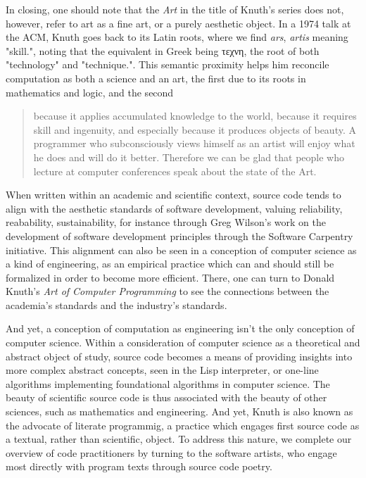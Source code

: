 In closing, one should note that the \emph{Art} in the title of Knuth's series does not, however, refer to art as a fine art, or a purely aesthetic object. In a 1974 talk at the ACM, Knuth goes back to its Latin roots, where we find \emph{ars}, \emph{artis} meaning "skill.", noting that the equivalent in Greek being τεχνη, the root of both "technology" and "technique.". This semantic proximity helps him reconcile computation as both a science and an art, the first due to its roots in mathematics and logic, and the second

\begin{quote}
  because it applies accumulated knowledge to the world, because it requires skill and ingenuity, and especially because it produces objects of beauty. A programmer who subconsciously views himself as an artist will enjoy what he does and will do it better. Therefore we can be glad that people who lecture at computer conferences speak about the state of the Art. \citep{knuth_computer_1974}
\end{quote}

When written within an academic and scientific context, source code tends to align with the aesthetic standards of software development, valuing reliability, reabability, sustainability, for instance through Greg Wilson's work on the development of software development principles through the Software Carpentry initiative. This alignment can also be seen in a conception of computer science as a kind of engineering, as an empirical practice which can and should still be formalized in order to become more efficient. There, one can turn to Donald Knuth's \emph{Art of Computer Programming} to see the connections between the academia's standards and the industry's standards.

And yet, a conception of computation as engineering isn't the only conception of computer science. Within a consideration of computer science as a  theoretical and abstract object of study, source code becomes a means of providing insights into more complex abstract concepts, seen in the Lisp interpreter, or one-line algorithms implementing foundational algorithms in computer science. The beauty of scientific source code is thus associated with the beauty of other sciences, such as mathematics and engineering. And yet, Knuth is also known as the advocate of literate programmig, a practice which engages first source code as a textual, rather than scientific, object. To address this nature, we complete our overview of code practitioners by turning to the software artists, who engage most directly with program texts through source code poetry.

